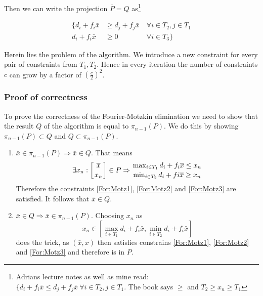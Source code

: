 
Then we can write the projection $\overline P=Q$ as\footnote{Adrians lecture notes as well as mine read: $\{d_i+f_i\bar x \leq d_j+f_j\bar x\ \forall i\in T_2, j\in T_1 $. The book says $\geq$ and $T_2\geq x_n \geq T_1$}

\begin{eqnarray*}
\{d_i+f_i\bar x & \geq d_j+f_j\bar x\ & \forall i\in T_2, j\in T_1  \\
d_i+f_i\bar x & \geq 0\ & \forall i\in T_3\}
\end{eqnarray*}


Herein lies the problem of the algorithm. We introduce a new constraint for every pair of constraints from $T_1,T_2$. Hence in every iteration the number of constraints $c$ can grow by a factor of $(\frac{c}{2})^2$.

\subsubsection*{Proof of correctness}
\begin{pr} To prove the correctness of the Fourier-Motzkin elimination we need to show that the result $Q$ of the algorithm is equal to $\pi_{n-1}(P)$. We do this by showing $\pi_{n-1}(P) \subset Q$ and $Q \subset \pi_{n-1}(P)$.
\begin{enumerate}

\item $\bar x \in \pi_{n-1}(P) \Rightarrow \bar x\in Q$. That means 
\[\exists x_n: \left[{\bar x}\atop{x_n}\right] \in P \Rightarrow {{\max_{i\in T_1} d_i +f_i \bar x \leq x_n} \atop {\min_{i\in T_2} d_i+fi\bar x \geq x_n}}\]
Therefore the constraints \ref{For:Motz1}, \ref{For:Motz2} and \ref{For:Motz3} are satisfied. It follows that $\bar x \in Q$. 

\item $\bar x \in Q \Rightarrow \bar x \in \pi_{n-1}(P)$. Choosing $x_n$ as 
\[x_n \in [\max_{i\in T_1} d_i+f_i \bar x, \min_{i\in T_2} d_i+f_i \bar x]\]
does the trick, as $(\bar x, x)$ then satisfies constrains \ref{For:Motz1}, \ref{For:Motz2} and \ref{For:Motz3} and therefore is in $P$.

\end{enumerate}
\end{pr}

